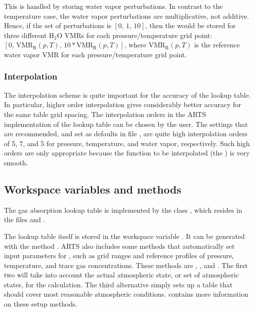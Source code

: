 This is handled by storing water vapor perturbations.  In contrast to
the temperature case, the water vapor perturbations are
multiplicative, not additive.  Hence, if the set of perturbations is
$[0,\, 1,\, 10]$, then the  would be stored for three
different H$_2$O VMRs for each pressure/temperature grid point: $[0,\,
\mathrm{VMR_R}(p,T),\, 10*\mathrm{VMR_R}(p,T)]$, where
$\mathrm{VMR_R}(p,T)$ is the reference water vapor VMR for each
pressure/temperature grid point.

\subsubsection{Interpolation}

The interpolation scheme is quite important for the accuracy of the
lookup table.  In particular, higher order interpolation gives
considerably better accuracy for the same table grid spacing.  The
interpolation orders in the ARTS implementation of the lookup table
can be chosen by the user.  The settings that are recommended, and set
as defaults in file , are quite high
interpolation orders of 5, 7, and 5 for pressure, temperature, and
water vapor, respectively.  Such high orders are only appropriate
because the function to be interpolated (the ) is very smooth.

\subsection{Workspace variables and methods}

The gas absorption lookup table is implemented by the class
, which resides in the files
 and .

The lookup table itself is stored in the workspace variable
.  It can be generated with the method
.  ARTS also includes some methods that
automatically set input parameters for ,
such as grid ranges and reference profiles of pressure, temperature,
and trace gas concentrations.  These methods are
, , and
.  The first two will take into account
the actual atmospheric state, or set of atmospheric states, for the
calculation. The third alternative simply sets up a table that should
cover most reasonable atmospheric conditions.
\citet{buehler:absor:11} contains more information on these setup
methods.

